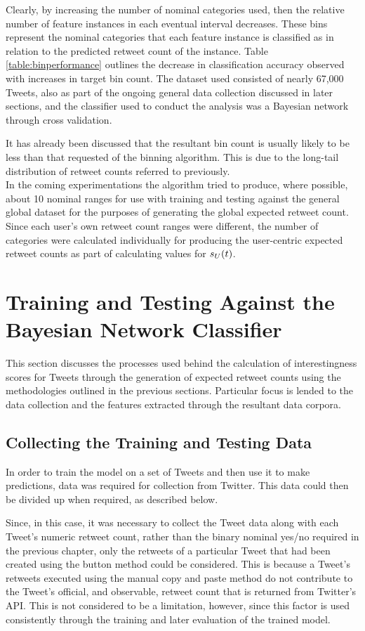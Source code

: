 Clearly, by increasing the number of nominal categories used, then the relative number of feature instances in each eventual interval decreases. These bins represent the nominal categories that each feature instance is classified as in relation to the predicted retweet count of the instance. Table \ref{table:binperformance} outlines the decrease in classification accuracy observed with increases in target bin count. The dataset used consisted of nearly 67,000 Tweets, also as part of the ongoing general data collection discussed in later sections, and the classifier used to conduct the analysis was a Bayesian network through cross validation.

It has already been discussed that the resultant bin count is usually likely to be less than that requested of the binning algorithm. This is due to the long-tail distribution of retweet counts referred to previously.\\
In the coming experimentations the algorithm tried to produce, where possible, about 10 nominal ranges for use with training and testing against the general global dataset for the purposes of generating the global expected retweet count. Since each user's own retweet count ranges were different, the number of categories were calculated individually for producing the user-centric expected retweet counts as part of calculating values for $s_U(t)$.


\section{Training and Testing Against the Bayesian Network Classifier}
This section discusses the processes used behind the calculation of interestingness scores for Tweets through the generation of expected retweet counts using the methodologies outlined in the previous sections. Particular focus is lended to the data collection and the features extracted through the resultant data corpora.


\subsection{Collecting the Training and Testing Data}
In order to train the model on a set of Tweets and then use it to make predictions, data was required for collection from Twitter. This data could then be divided up when required, as described below.

Since, in this case, it was necessary to collect the Tweet data along with each Tweet's numeric retweet count, rather than the binary nominal yes/no required in the previous chapter, only the retweets of a particular Tweet that had been created using the button method could be considered. This is because a Tweet's retweets executed using the manual copy and paste method do not contribute to the Tweet's official, and observable, retweet count that is returned from Twitter's API. This is not considered to be a limitation, however, since this factor is used consistently through the training and later evaluation of the trained model.

